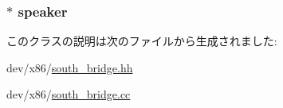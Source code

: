 \label{classSouthBridge_a75b48f1787959a4617f2a599d7c09aab}
\hypertarget{classSouthBridge_a0c67494091d5f123bd1f8b55a4ae428b}{
\subsubsection[{speaker}]{$\ast$ {\bf speaker}}}
\label{classSouthBridge_a0c67494091d5f123bd1f8b55a4ae428b}


このクラスの説明は次のファイルから生成されました:\begin{DoxyCompactItemize}
\item 
dev/x86/\hyperlink{south__bridge_8hh}{south\_\-bridge.hh}\item 
dev/x86/\hyperlink{south__bridge_8cc}{south\_\-bridge.cc}\end{DoxyCompactItemize}
